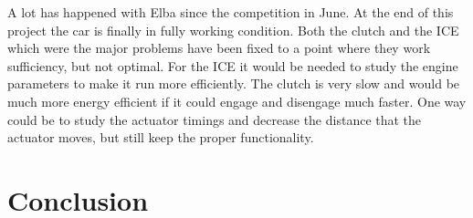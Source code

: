 A lot has happened with Elba since the competition in June. At the end of this
project the car is finally in fully working condition. Both the clutch and the
ICE which were the major problems have been fixed to a point where they work
sufficiency, but not optimal. For the ICE it would be needed to study the engine
parameters to make it run more efficiently. The clutch is very slow and would be
much more energy efficient if it could engage and disengage much faster. One way
could be to study the actuator timings and decrease the distance that the
actuator moves, but still keep the proper functionality.

\section{Conclusion}
